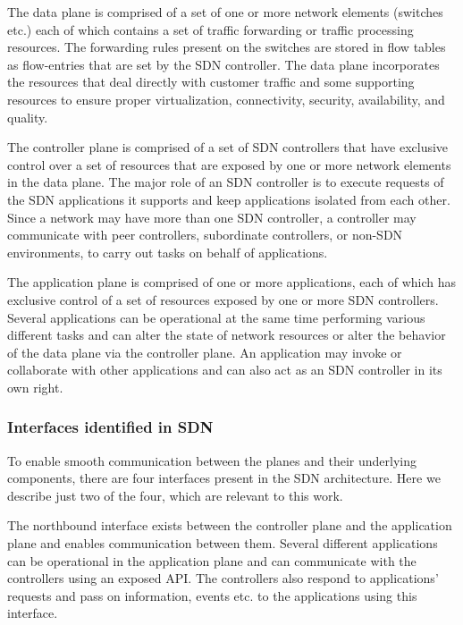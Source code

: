  The data plane is comprised of a set of one or
more network elements (switches etc.) each of which contains a set of
traffic forwarding or traffic processing resources. The forwarding 
rules present on the switches are stored in flow tables as flow-entries 
that are set by the SDN controller. The data plane incorporates the 
resources that deal directly with customer traffic and some supporting
resources to ensure proper virtualization, connectivity, security, 
availability, and quality.
		
 The controller plane is comprised of a
set of SDN controllers that have exclusive control over a set of 
resources that are exposed by one or more network elements in the data
plane. The major role of an SDN controller is to execute requests of 
the SDN applications it supports and keep applications isolated from 
each other. Since a network may have more than one SDN controller, a
controller may communicate with peer controllers, subordinate 
controllers, or non-SDN environments, to carry out tasks on behalf of
applications.
	
 The application plane is comprised of
one or more applications, each of which has exclusive control of a set
of resources exposed by one or more SDN controllers.  Several
applications can be operational at the same time performing various
different tasks and can alter the state of network resources or alter
the behavior of the data plane via the controller plane. An application
may invoke or collaborate with other applications and can also act as an
SDN controller in its own right.

\subsubsection{Interfaces identified in SDN}

To enable smooth communication between the planes and their underlying
components, there are four interfaces present in the SDN architecture. 
Here we describe just two of the four, which are relevant to this work.

 The northbound interface 
exists between the controller plane and the application plane and 
enables communication between them. Several different applications 
can be operational in the application plane and can communicate with
the controllers using an exposed API. The controllers also respond to 
applications' requests and pass on information, events etc. to the 
applications using this interface.
	

